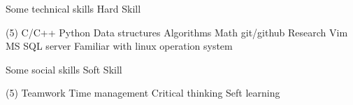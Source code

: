 

\begin{cvparagraph}
\begin{cventries}
	\cventry
	{Some technical skills}
	{Hard Skill}
	{}
	{}
	{
		\begin{tasks}[style=itemize, column-sep=-10mm, label-align=left, label-offset={0mm}, label-width={3mm}, item-indent={10mm}](5)%
			\task C/C++
			\task Python
			\task Data structures
			\task Algorithms
			\task Math
			\task git/github
			\task Research
			\task Vim
			\task MS SQL server
			\task Familiar with linux operation system
		\end{tasks}
	}
	\cventry
	{Some social skills}
	{Soft Skill}
	{}
	{}
	{
		\begin{tasks}[style=itemize, column-sep=-10mm, label-align=left, label-offset={0mm}, label-width={3mm}, item-indent={10mm}](5)%
			\task Teamwork
			\task Time management
			\task Critical thinking
			\task Seft learning
		\end{tasks}
	}
\end{cventries}
\end{cvparagraph}

